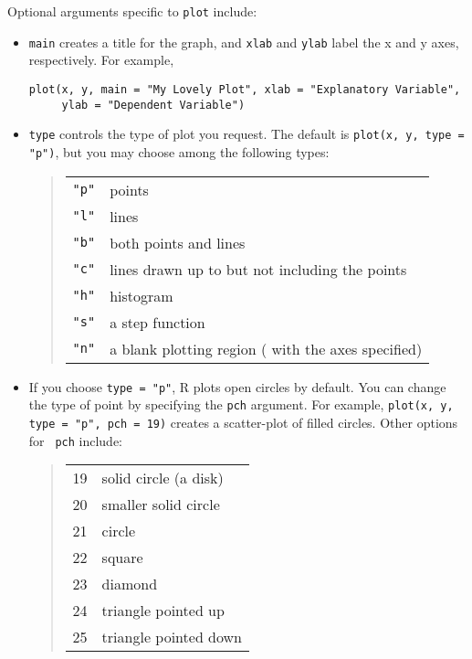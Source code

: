 Optional arguments specific to \texttt{plot} include:
\begin{itemize}
\item \texttt{main} creates a title for the graph, and \texttt{xlab}
  and \texttt{ylab} label the x and y axes, respectively. For
  example,
\begin{verbatim}
plot(x, y, main = "My Lovely Plot", xlab = "Explanatory Variable", 
     ylab = "Dependent Variable")
\end{verbatim}
  
\item \texttt{type} controls the type of plot you request.  The
  default is \texttt{plot(x, y, type = "p")}, but you may choose among
  the following types:
    \begin{table}[!h]
    \begin{quote}
    \begin{tabular}{cl}
    {\tt "p"} & points\\
    {\tt "l"} & lines\\
    {\tt "b"} & both points and lines\\
    {\tt "c"} & lines drawn up to but not including the points\\
    {\tt "h"} & histogram\\
    {\tt "s"} & a step function\\
    {\tt "n"} & a blank plotting region ( with the axes specified)
    \end{tabular}
    \end{quote}
    \end{table}
\item If you choose {\tt type = "p"}, R plots open circles by default.
  You can change the type of point by specifying the {\tt pch}
  argument.  For example, \texttt{plot(x, y, type = "p", pch = 19)}
  creates a scatter-plot of filled circles.  Other options for {\tt
    pch} include:
    \begin{table}[!h]
    \begin{quote}
    \begin{tabular}{cl}
    19 & solid circle (a disk) \\
    20 & smaller solid circle \\
    21 & circle\\
    22 & square\\
    23 & diamond \\
    24 & triangle pointed up\\
    25 & triangle pointed down\\
    \end{tabular}
    \end{quote}
    \end{table}


\end{itemize}
